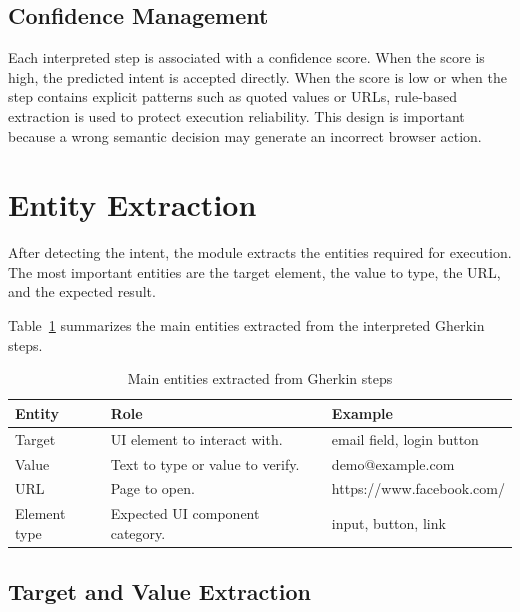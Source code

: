 \subsection{Confidence Management}
\label{subsec:confidence_management}

Each interpreted step is associated with a confidence score. When the score is high, the predicted intent is accepted directly. When the score is low or when the step contains explicit patterns such as quoted values or URLs, rule-based extraction is used to protect execution reliability. This design is important because a wrong semantic decision may generate an incorrect browser action.

\section{Entity Extraction}
\label{sec:entity_extraction}

After detecting the intent, the module extracts the entities required for execution. The most important entities are the target element, the value to type, the URL, and the expected result.

Table~\ref{tab:extracted_entities} summarizes the main entities extracted from the interpreted Gherkin steps.

\begin{table}[H]
	\centering
	\caption{Main entities extracted from Gherkin steps}
	\label{tab:extracted_entities}
	\renewcommand{\arraystretch}{1.3}
	\small
	\begin{tabularx}{\textwidth}{|l|X|X|}
		\hline
		\rowcolor{gray!20}
		\textbf{Entity} & \textbf{Role} & \textbf{Example} \\ \hline
		Target & UI element to interact with. & email field, login button \\ \hline
		Value & Text to type or value to verify. & demo@example.com \\ \hline
		URL & Page to open. & https://www.facebook.com/ \\ \hline
		Element type & Expected UI component category. & input, button, link \\ \hline
	\end{tabularx}
\end{table}

\subsection{Target and Value Extraction}
\label{subsec:target_value_extraction}

